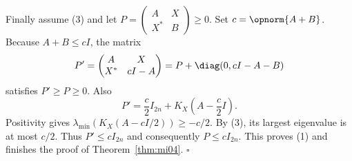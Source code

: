 Finally assume (3) and let
$P=\begin{pmatrix}A&X\\X^*&B\end{pmatrix}\geq0$.
Set $c=\opnorm{A+B}$. Because $A+B\leq cI$, the matrix
\[
 P'=\begin{pmatrix}A&X\\X^*&cI-A\end{pmatrix}
 =P+\diag(0,cI-A-B)
\]
satisfies $P'\geq P\geq0$. Also
\[
 P'=\frac c2I_{2n}+K_X\left(A-\frac c2I\right).
\]
Positivity gives $\lambda_{\min}(K_X(A-cI/2))\geq-c/2$. By (3), its largest eigenvalue is at most $c/2$. Thus $P'\leq cI_{2n}$ and consequently $P\leq cI_{2n}$. This proves (1) and finishes the proof of Theorem~\ref{thm:mi04}.
\hfill$\square$
